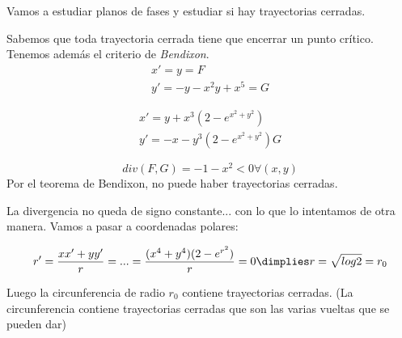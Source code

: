 \documentclass[nochap]{apuntes}
\begin{document}
\begin{problem}[19]
Vamos a estudiar planos de fases y estudiar si hay trayectorias cerradas.

Sabemos que toda trayectoria cerrada tiene que encerrar un punto crítico. Tenemos además el criterio de \textit{Bendixon}.
\ppart\[\begin{array}{c}
x'=y = F\\y'=-y-x^2y+x^5 = G\end{array}\]

\ppart\[\begin{array}{c}
x'=y+x^3(2-e^{x^2+y^2})\\ y'=-x-y^3(2-e^{x^2+y^2})G\end{array}\]

\solution

\spart
\[div(F,G) = -1-x^2<0 \forall(x,y)\]
Por el teorema de Bendixon, no puede haber trayectorias cerradas.

\spart
La divergencia no queda de signo constante... con lo que lo intentamos de otra manera. Vamos a pasar a coordenadas polares:

\[r' = \frac{xx'+yy'}{r} = ... = \frac{(x^4+y^4)(2-e^{r^2})}{r} = 0 \dimplies r=\sqrt{log2} = r_0\]

Luego la circunferencia de radio $r_0$ contiene trayectorias cerradas. (La circunferencia contiene trayectorias cerradas que son las varias vueltas que se pueden dar)
\end{problem}
\end{document}
